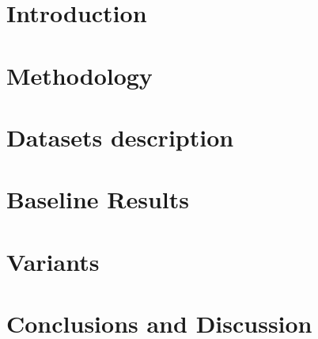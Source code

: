 \documentclass[trackchanges]{aastex7}
\begin{document}

\section{Introduction} \label{sec:intro}


\section{Methodology}  \label{sec:meth}


\section{Datasets description} \label{sec:data_summary}


\section  {Baseline Results} \label{sec:results}


\section {Variants} \label{sec:variants}


\section{Conclusions and Discussion} \label{sec:conc}




{}


\appendix


\end{document}
